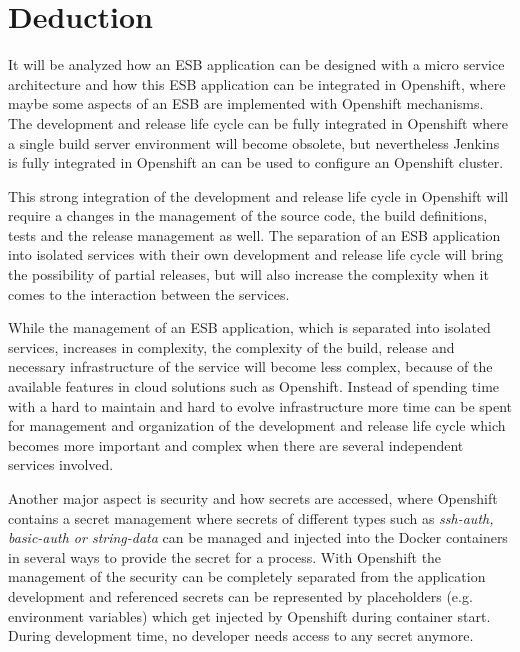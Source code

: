 \section{Deduction}
\label{sec:deduction}
It will be analyzed how an ESB application can be designed with a micro service architecture and how this ESB application can be integrated in Openshift, where maybe some aspects of an ESB are implemented with Openshift mechanisms. The development and release life cycle can be fully integrated in Openshift where a single build server environment will become obsolete, but nevertheless Jenkins is fully integrated in Openshift an can be used to configure an Openshift cluster.

This strong integration of the development and release life cycle in Openshift will require a changes in the management of the source code, the build definitions, tests and the release management as well. The separation of an ESB application into isolated services with their own development and release life cycle will bring the possibility of partial releases, but will also increase the complexity when it comes to the interaction between the services.

While the management of an ESB application, which is separated into isolated services, increases in complexity, the complexity of the build, release and necessary infrastructure  of the service will become less complex, because of the available features in cloud solutions such as Openshift. Instead of spending time with a hard to maintain and hard to evolve infrastructure more time can be spent for management and organization of the development and release life cycle which becomes more important and complex when there are several independent services involved.

Another major aspect is security and how secrets are accessed, where Openshift contains a secret management where secrets of different types such as \emph{ssh-auth, basic-auth or string-data} can be managed and injected into the Docker containers in several ways to provide the secret for a process. With Openshift the management of the security can be completely separated from the application development and referenced secrets can be represented by placeholders (e.g. environment variables) which get injected by Openshift during container start. During development time, no developer needs access to any secret anymore.